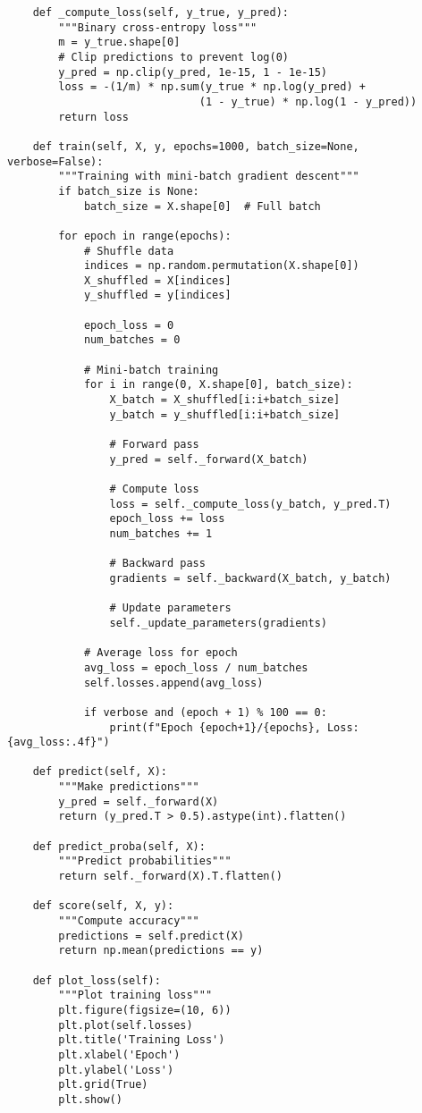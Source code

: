 ﻿\documentclass[12pt,a4paper]{article}
\begin{document}
\begin{lstlisting}
    def _compute_loss(self, y_true, y_pred):
        """Binary cross-entropy loss"""
        m = y_true.shape[0]
        # Clip predictions to prevent log(0)
        y_pred = np.clip(y_pred, 1e-15, 1 - 1e-15)
        loss = -(1/m) * np.sum(y_true * np.log(y_pred) + 
                              (1 - y_true) * np.log(1 - y_pred))
        return loss
    
    def train(self, X, y, epochs=1000, batch_size=None, verbose=False):
        """Training with mini-batch gradient descent"""
        if batch_size is None:
            batch_size = X.shape[0]  # Full batch
        
        for epoch in range(epochs):
            # Shuffle data
            indices = np.random.permutation(X.shape[0])
            X_shuffled = X[indices]
            y_shuffled = y[indices]
            
            epoch_loss = 0
            num_batches = 0
            
            # Mini-batch training
            for i in range(0, X.shape[0], batch_size):
                X_batch = X_shuffled[i:i+batch_size]
                y_batch = y_shuffled[i:i+batch_size]
                
                # Forward pass
                y_pred = self._forward(X_batch)
                
                # Compute loss
                loss = self._compute_loss(y_batch, y_pred.T)
                epoch_loss += loss
                num_batches += 1
                
                # Backward pass
                gradients = self._backward(X_batch, y_batch)
                
                # Update parameters
                self._update_parameters(gradients)
            
            # Average loss for epoch
            avg_loss = epoch_loss / num_batches
            self.losses.append(avg_loss)
            
            if verbose and (epoch + 1) % 100 == 0:
                print(f"Epoch {epoch+1}/{epochs}, Loss: {avg_loss:.4f}")
    
    def predict(self, X):
        """Make predictions"""
        y_pred = self._forward(X)
        return (y_pred.T > 0.5).astype(int).flatten()
    
    def predict_proba(self, X):
        """Predict probabilities"""
        return self._forward(X).T.flatten()
    
    def score(self, X, y):
        """Compute accuracy"""
        predictions = self.predict(X)
        return np.mean(predictions == y)
    
    def plot_loss(self):
        """Plot training loss"""
        plt.figure(figsize=(10, 6))
        plt.plot(self.losses)
        plt.title('Training Loss')
        plt.xlabel('Epoch')
        plt.ylabel('Loss')
        plt.grid(True)
        plt.show()
\end{lstlisting}
\end{document}
